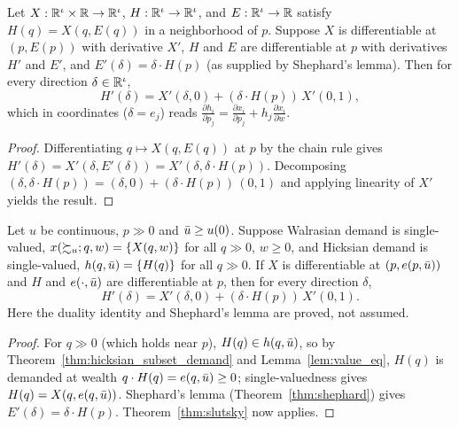\begin{theorem}
\label{thm:slutsky}
\leanok
{}
Let $X : \mathbb{R}^\iota \times \mathbb{R} \to \mathbb{R}^\iota$, $H : \mathbb{R}^\iota \to \mathbb{R}^\iota$, and
$E : \mathbb{R}^\iota \to \mathbb{R}$ satisfy $H(q) = X(q, E(q))$ in a neighborhood of $p$. Suppose
$X$ is differentiable at $(p, E(p))$ with derivative $X'$, $H$ and $E$ are differentiable
at $p$ with derivatives $H'$ and $E'$, and $E'(\delta) = \delta \cdot H(p)$ (as supplied
by Shephard's lemma). Then for every direction $\delta \in \mathbb{R}^\iota$,
\[
  H'(\delta) = X'(\delta, 0) + (\delta \cdot H(p))\, X'(0, 1),
\]
which in coordinates ($\delta = e_j$) reads
$\frac{\partial h_i}{\partial p_j} = \frac{\partial x_i}{\partial p_j} + h_j \frac{\partial x_i}{\partial w}$.
\end{theorem}
\begin{proof}
\leanok
Differentiating $q \mapsto X(q, E(q))$ at $p$ by the chain rule gives
$H'(\delta) = X'(\delta, E'(\delta)) = X'(\delta, \delta \cdot H(p))$.
Decomposing $(\delta, \delta \cdot H(p)) = (\delta, 0) + (\delta \cdot H(p))\,(0, 1)$
and applying linearity of $X'$ yields the result.
\end{proof}

\begin{theorem}
\label{thm:slutsky_demand}
\leanok
{}
Let $u$ be continuous, $p \gg 0$ and $\bar{u} \ge u(0)$. Suppose Walrasian demand is
single-valued, $x(\succsim_u; q, w) = \{X(q, w)\}$ for all $q \gg 0$, $w \ge 0$, and Hicksian
demand is single-valued, $h(q, \bar{u}) = \{H(q)\}$ for all $q \gg 0$. If $X$ is differentiable
at $(p, e(p, \bar{u}))$ and $H$ and $e(\cdot, \bar{u})$ are differentiable at $p$, then for every
direction $\delta$,
\[
  H'(\delta) = X'(\delta, 0) + (\delta \cdot H(p))\, X'(0, 1).
\]
Here the duality identity and Shephard's lemma are proved, not assumed.
\end{theorem}
\begin{proof}
\leanok
For $q \gg 0$ (which holds near $p$), $H(q) \in h(q, \bar{u})$, so by
Theorem~\ref{thm:hicksian_subset_demand} and Lemma~\ref{lem:value_eq}, $H(q)$ is demanded at
wealth $q \cdot H(q) = e(q, \bar{u}) \ge 0$; single-valuedness gives $H(q) = X(q, e(q, \bar{u}))$.
Shephard's lemma (Theorem~\ref{thm:shephard}) gives $E'(\delta) = \delta \cdot H(p)$.
Theorem~\ref{thm:slutsky} now applies.
\end{proof}


